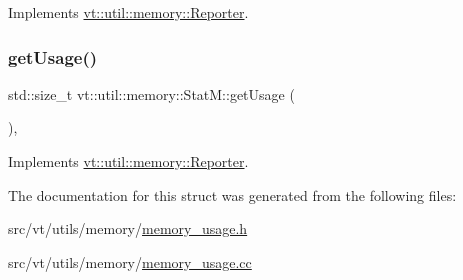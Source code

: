 Implements \hyperlink{structvt_1_1util_1_1memory_1_1_reporter_a83fc36e9cff3ce2deedf1d4546694713}{vt\+::util\+::memory\+::\+Reporter}.

\mbox{\label{structvt_1_1util_1_1memory_1_1_stat_m_a066c740a52e05e7184dfff530ed07173}} 
\subsubsection{\texorpdfstring{get\+Usage()}{getUsage()}}
{\footnotesize\ttfamily std\+::size\+\_\+t vt\+::util\+::memory\+::\+Stat\+M\+::get\+Usage (\begin{DoxyParamCaption}{ }\end{DoxyParamCaption})\hspace{0.3cm}{\ttfamily [override]}, {\ttfamily [virtual]}}



Implements \hyperlink{structvt_1_1util_1_1memory_1_1_reporter_a372574f51fdb68077cd3d227ee373de5}{vt\+::util\+::memory\+::\+Reporter}.



The documentation for this struct was generated from the following files\+:\begin{DoxyCompactItemize}
\item 
src/vt/utils/memory/\hyperlink{memory__usage_8h}{memory\+\_\+usage.\+h}\item 
src/vt/utils/memory/\hyperlink{memory__usage_8cc}{memory\+\_\+usage.\+cc}\end{DoxyCompactItemize}
